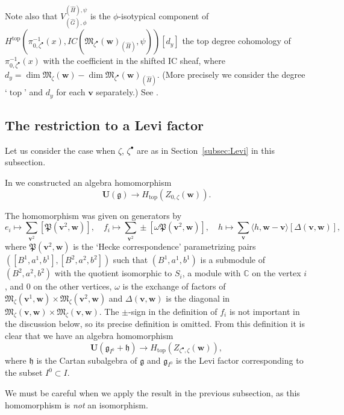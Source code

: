 \documentclass[pdftex]{sigma}
\theoremstyle{definition}
\numberwithin{equation}{section}
\newcommand{\subsecref}[1]{Section~\ref{#1}}
\newcommand{\C}{{\mathbb C}}
\newcommand{\g}{{\mathfrak g}}
\newcommand{\M}{{\mathfrak M}} %
\newcommand{\bv}{{\mathbf v}} %
\newcommand{\bw}{{\mathbf w}} %
\newcommand{\topdeg}{{\operatorname{top}}} %
\newcommand{\bU}{\mathbf U} %
\newcommand{\Pa}{{\mathfrak P}} %
\begin{document}
Note also that $V_{(\widehat G),\phi}^{(\widehat H),\psi}$ is the
$\phi$-isotypical component of
\(
   H^{\topdeg}(\pi_{0,\zeta^\bullet}^{-1}(x),
   IC(\M_{\zeta^\bullet}(\bw)_{(\widehat H)},\psi))[d_y]
\)
the top degree cohomology of $\pi_{0,\zeta^\bullet}^{-1}(x)$ with the
coef\/f\/icient in the shifted IC sheaf, where
$d_y = \dim \M_\zeta(\bw) - \dim \M_{\zeta^\bullet}(\bw)_{(\widehat H)}$.
(More precisely we consider the degree `$\topdeg$' and $d_y$ for each
$\bv$ separately.) See \cite[1.10]{BM}.


\subsection{The restriction to a Levi factor}\label{subsec:rest_Levi}

Let us consider the case when $\zeta$, $\zeta^\bullet$ are as in
\subsecref{subsec:Levi} in this subsection.

In \cite{Na-alg} we constructed an algebra homomorphism
\begin{equation*}
   \bU(\g) \to H_{\topdeg}(Z_{0,\zeta}(\bw)).
\end{equation*}

The homomorphism was given on generators by
\begin{equation*}
   e_i \mapsto \sum_{\bv^2} [\Pa(\bv^2,\bw)],\quad
   f_i \mapsto \sum_{\bv^2} \pm [\omega\Pa(\bv^2,\bw)], \quad
   h \mapsto \sum_{\bv} \langle h, \bw - \bv\rangle [\Delta(\bv,\bw)],
\end{equation*}
where $\Pa(\bv^2,\bw)$ is the `Hecke correspondence' parametrizing
pairs $([B^1,a^1,b^1],[B^2,a^2,b^2])$ such that $(B^1,a^1,b^1)$ is a
submodule of $(B^2,a^2,b^2)$ with the quotient isomorphic to $S_i$, a
module with $\C$ on the vertex $i$, and $0$ on the other vertices,
$\omega$ is the exchange of factors of $\M_\zeta(\bv^1,\bw)\times
\M_\zeta(\bv^2,\bw)$ and $\Delta(\bv,\bw)$ is the diagonal in
$\M_\zeta(\bv,\bw)\times \M_\zeta(\bv,\bw)$. The $\pm$-sign in the
def\/inition of $f_i$ is not important in the discussion below, so its
precise def\/inition is omitted.
%
From this def\/inition it is clear that we have an algebra homomorphism
\begin{equation*}
   \bU(\g_{I^0}+\mathfrak h) \to H_{\topdeg}(Z_{\zeta^\bullet,\zeta}(\bw)),
\end{equation*}
where $\mathfrak h$ is the Cartan subalgebra of $\g$ and $\g_{I^0}$ is
the Levi factor corresponding to the subset $I^0\subset I$.

We must be careful when we apply the result in the previous
subsection, as this homomorphism is {\it not\/} an isomorphism.
\end{document}
